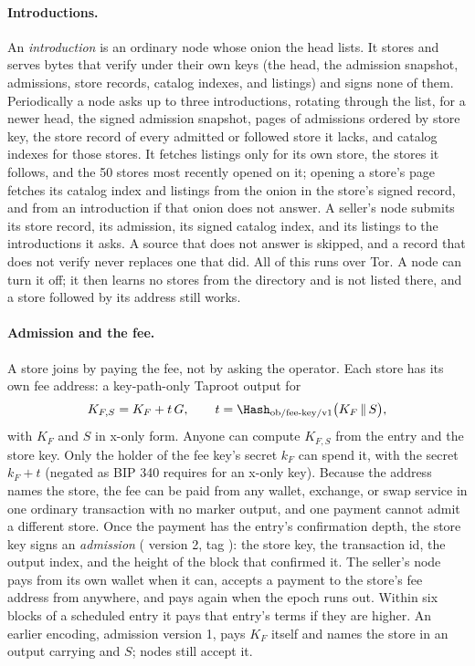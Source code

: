 \paragraph{Introductions.} An \emph{introduction} is an ordinary node whose onion the head lists. It stores and serves bytes that verify under their own keys (the head, the admission snapshot, admissions, store records, catalog indexes, and listings) and signs none of them. Periodically a node asks up to three introductions, rotating through the list, for a newer head, the signed admission snapshot, pages of admissions ordered by store key, the store record of every admitted or followed store it lacks, and catalog indexes for those stores. It fetches listings only for its own store, the stores it follows, and the 50 stores most recently opened on it; opening a store's page fetches its catalog index and listings from the onion in the store's signed record, and from an introduction if that onion does not answer. A seller's node submits its store record, its admission, its signed catalog index, and its listings to the introductions it asks. A source that does not answer is skipped, and a record that does not verify never replaces one that did. All of this runs over Tor. A node can turn it off; it then learns no stores from the directory and is not listed there, and a store followed by its address still works.

\paragraph{Admission and the fee.} A store joins by paying the fee, not by asking the operator. Each store has its own fee address: a key-path-only Taproot output for
\[
  K_{F,S} = K_F + t\,G,\qquad t = \Hash_{\mathrm{ob/fee\text{-}key/v1}}\bigl(K_F \,\|\, S\bigr),
\]
with $K_F$ and $S$ in x-only form. Anyone can compute $K_{F,S}$ from the entry and the store key. Only the holder of the fee key's secret $k_F$ can spend it, with the secret $k_F+t$ (negated as BIP 340 requires for an x-only key). Because the address names the store, the fee can be paid from any wallet, exchange, or swap service in one ordinary transaction with no marker output, and one payment cannot admit a different store. Once the payment has the entry's confirmation depth, the store key signs an \emph{admission} ( version 2, tag ): the store key, the transaction id, the output index, and the height of the block that confirmed it. The seller's node pays from its own wallet when it can, accepts a payment to the store's fee address from anywhere, and pays again when the epoch runs out. Within six blocks of a scheduled entry it pays that entry's terms if they are higher. An earlier encoding, admission version 1, pays $K_F$ itself and names the store in an  output carrying  and $S$; nodes still accept it.

